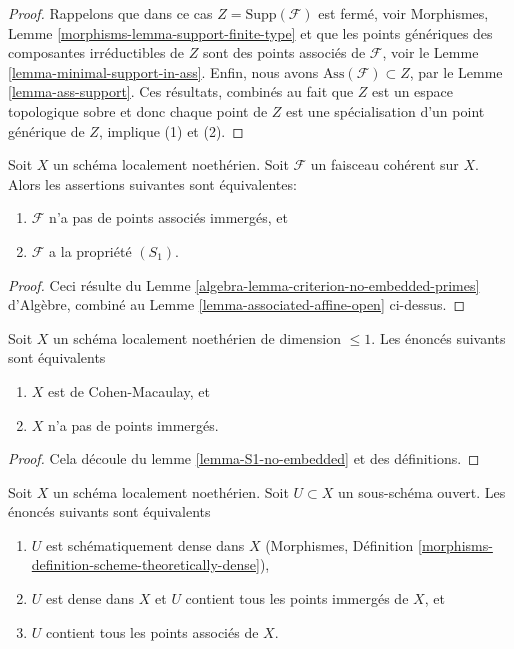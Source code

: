 \begin{proof}
Rappelons que dans ce cas $Z = \text{Supp}(\mathcal{F})$ est fermé, voir Morphismes,
Lemme \ref{morphisms-lemma-support-finite-type}  et que les points génériques des composantes irréductibles de
 $Z$ sont des points associés de $\mathcal{F}$, voir le Lemme  \ref{lemma-minimal-support-in-ass}.
Enfin, nous avons  $\text{Ass}(\mathcal{F}) \subset Z$, par le Lemme  \ref{lemma-ass-support}. Ces résultats, combinés au
fait que  $Z$ est un espace topologique sobre et donc chaque point
de $Z$ est une spécialisation d'un point générique de $Z$, implique
(1) et (2).
\end{proof}

\begin{lemma}
\label{lemma-S1-no-embedded}
Soit $X$ un schéma localement noethérien. Soit $\mathcal{F}$ un
faisceau cohérent sur $X$. Alors les assertions suivantes sont équivalentes:
\begin{enumerate}
\item $\mathcal{F}$  n’a pas de points associés immergés, et
\item $\mathcal{F}$  a la propriété  $(S_1)$.
\end{enumerate}
\end{lemma}

\begin{proof}
Ceci résulte du Lemme  \ref{algebra-lemma-criterion-no-embedded-primes} d'Algèbre, combiné au Lemme  \ref{lemma-associated-affine-open}
ci-dessus.
\end{proof}

\begin{lemma}
\label{lemma-noetherian-dim-1-CM-no-embedded-points}
Soit  $X$  un schéma localement noethérien de dimension  $\leq 1$. Les
énoncés suivants sont équivalents
\begin{enumerate}
\item $X$  est de Cohen-Macaulay, et
\item $X$  n'a pas de points immergés.
\end{enumerate}
\end{lemma}

\begin{proof}
Cela découle du lemme  \ref{lemma-S1-no-embedded}  et des définitions.
\end{proof}

\begin{lemma}
\label{lemma-scheme-theoretically-dense-contain-embedded-points}
Soit  $X$  un schéma localement noethérien. Soit  $U \subset X$  un
sous-schéma ouvert. Les énoncés suivants sont équivalents
\begin{enumerate}
\item $U$  est schématiquement dense dans  $X$  (Morphismes, Définition
 \ref{morphisms-definition-scheme-theoretically-dense}),
\item $U$  est dense dans  $X$  et  $U$  contient tous les points
immergés de  $X$, et
\item $U$  contient tous les points associés de  $X$.
\end{enumerate}
\end{lemma}

